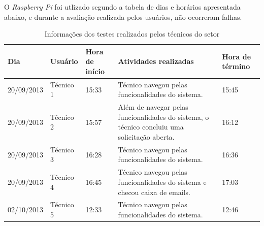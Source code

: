 O \textit{Raspberry Pi} foi utlizado segundo a tabela de dias e horários apresentada abaixo, e durante a avaliação realizada pelos usuários, não ocorreram falhas.

\newpage

\begin{table}[!htpb]
 \centering
    \begin{tabular}{|p{2cm}|p{2cm}|p{2cm}|p{5cm}|p{2cm}|} 
    \hline
        \textbf{Dia} & \textbf{Usuário} & \textbf{Hora de início} & \textbf{Atividades realizadas} &  \textbf{Hora de término} \\
    \hline
         20/09/2013 & Técnico 1 & 15:33 & Técnico navegou pelas funcionalidades do sistema. & 15:45 \\
    \hline
        20/09/2013 & Técnico 2 & 15:57 & Além de navegar pelas funcionalidades do sistema, o técnico concluiu uma solicitação aberta. & 16:12 \\
    \hline
        20/09/2013 & Técnico 3 & 16:28 & Técnico navegou pelas funcionalidades do sistema. & 16:36 \\
    \hline
        20/09/2013 & Técnico 4 & 16:45 & Técnico navegou pelas funcionalidades do sistema e checou caixa de emails. & 17:03 \\
    \hline
        02/10/2013 & Técnico 5 & 12:33 & Técnico navegou pelas funcionalidades do sistema. & 12:46 \\
    \hline
    \end{tabular}
    \caption{Informações dos testes realizados pelos técnicos do setor}
    \label{t_fixa}
\end{table}
